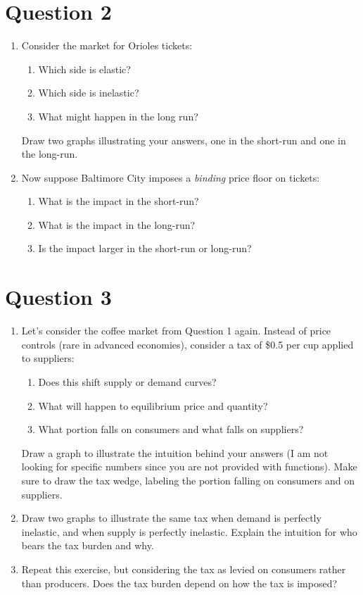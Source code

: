 \documentclass[12pt]{article}
\begin{document}
\section*{Question 2}

\begin{enumerate}
\item Consider the market for Orioles tickets:
\begin{enumerate}
    \item Which side is elastic?
    \item Which side is inelastic?
    \item What might happen in the long run?
\end{enumerate}

Draw two graphs illustrating your answers, one in the short-run and one in the long-run.


\item Now suppose Baltimore City imposes a \textit{binding} price floor on tickets:
    \begin{enumerate}
        \item What is the impact in the short-run?
        \item What is the impact in the long-run?
        \item Is the impact larger in the short-run or long-run?
    \end{enumerate}

    \end{enumerate}

\section*{Question 3}
\begin{enumerate}
\item Let's consider the coffee market from Question 1 again. Instead of price controls (rare in advanced economies), consider a tax of \$0.5 per cup applied to suppliers:

\begin{enumerate}
    \item Does this shift supply or demand curves?
    \item What will happen to equilibrium price and quantity?
    \item What portion falls on consumers and what falls on suppliers?
\end{enumerate}

 Draw a graph to illustrate the intuition behind your answers (I am not looking for specific numbers since you are not provided with functions). Make sure to draw the tax wedge, labeling the portion falling on consumers and on suppliers.


\item Draw two graphs to illustrate the same tax when demand is perfectly inelastic, and when supply is perfectly inelastic. Explain the intuition for who bears the tax burden and why.

\item Repeat this exercise, but considering the tax as levied on consumers rather than producers. Does the tax burden depend on how the tax is imposed?

\end{enumerate}
\end{document}
